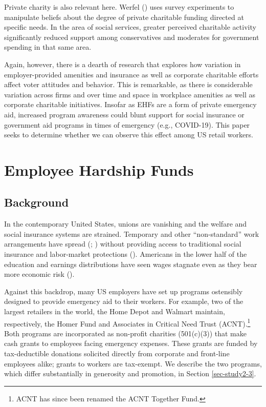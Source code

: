\documentclass[
  11pt,
  oneside]{article}
\begin{document}
Private charity is also relevant here. Werfel () uses survey experiments to manipulate beliefs about the degree of private charitable funding directed at specific needs. In the area of social services, greater perceived charitable activity significantly reduced support among conservatives and moderates for government spending in that same area.

Again, however, there is a dearth of research that explores how variation in employer-provided amenities and insurance as well as corporate charitable efforts affect voter attitudes and behavior. This is remarkable, as there is considerable variation across firms and over time and space in workplace amenities as well as corporate charitable initiatives. Insofar as EHFs are a form of private emergency aid, increased program awareness could blunt support for social insurance or government aid programs in times of emergency (e.g., COVID-19). This paper seeks to determine whether we can observe this effect among US retail workers.

\section{Employee Hardship Funds}\label{sec-ehf-bkgrnd}

\subsection{Background}\label{background}

In the contemporary United States, unions are vanishing and the welfare and social insurance systems are strained. Temporary and other ``non-standard'' work arrangements have spread (; ) without providing access to traditional social insurance and labor-market protections (). Americans in the lower half of the education and earnings distributions have seen wages stagnate even as they bear more economic risk ().

Against this backdrop, many US employers have set up programs ostensibly designed to provide emergency aid to their workers. For example, two of the largest retailers in the world, the Home Depot and Walmart maintain, respectively, the Homer Fund and Associates in Critical Need Trust (ACNT).\footnote{ACNT has since been renamed the ACNT Together Fund.} Both programs are incorporated as non-profit charities (501(c)(3)) that make cash grants to employees facing emergency expenses. These grants are funded by tax-deductible donations solicited directly from corporate and front-line employees alike; grants to workers are tax-exempt. We describe the two programs, which differ substantially in generosity and promotion, in Section \ref{sec-study2-3}.
\end{document}
